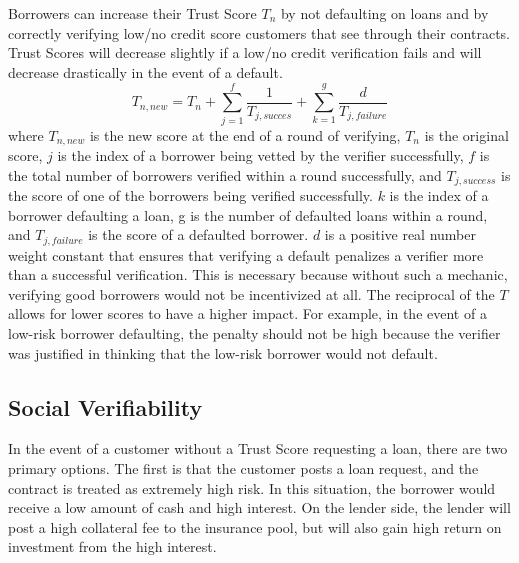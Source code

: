 \documentclass[twoside]{article}
\begin{document}
Borrowers can increase their Trust Score $T_{n}$ by not defaulting on loans and by correctly verifying low/no credit score customers that see through their contracts. Trust Scores will decrease slightly if a low/no credit verification fails and will decrease drastically in the event of a default. 
\begin{equation}
T_{n,new} = T_{n} + \sum\limits_{j=1}^f  \frac{1}{T_{j,succes}} + \sum\limits_{k=1}^g  \frac{d}{T_{j,failure}}
\end{equation}
where $T_{n,new}$ is the new score at the end of a round of verifying, $T_{n}$ is the original score, $j$ is the index of a borrower being vetted by the verifier successfully, $f$ is the total number of borrowers verified within a round successfully, and $T_{j,success}$ is the score of one of the borrowers being verified successfully. $k$ is the index of a borrower defaulting a loan, g is the number of defaulted loans within a round, and $T_{j,failure}$ is the score of a defaulted borrower. $d$ is a positive real number weight constant that ensures that verifying a default penalizes a verifier more than a successful verification. This is necessary because without such a mechanic, verifying good borrowers would not be incentivized at all. The reciprocal of the $T$ allows for lower scores to have a higher impact. For example, in the event of a low-risk borrower defaulting, the penalty should not be high because the verifier was justified in thinking that the low-risk borrower would not default.
 
\subsection{Social Verifiability}
In the event of a customer without a Trust Score requesting a loan, there are two primary options. The first is that the customer posts a loan request, and the contract is treated as extremely high risk. In this situation, the borrower would receive a low amount of cash and high interest. On the lender side, the lender will post a high collateral fee to the insurance pool, but will also gain high return on investment from the high interest. 
\end{document}
